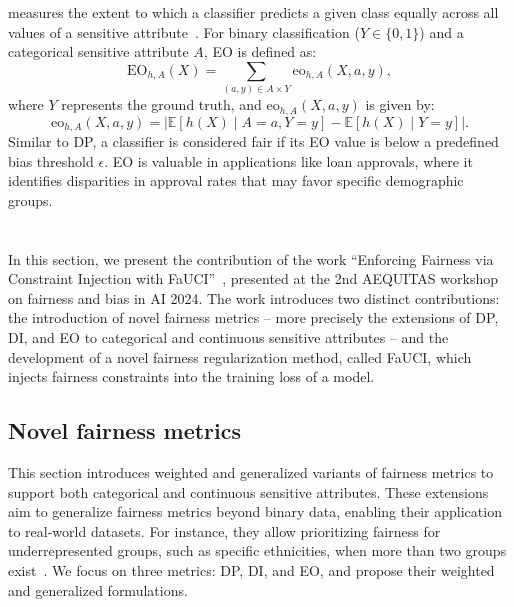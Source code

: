  measures the extent to which a classifier predicts a given class equally across all values of a sensitive attribute~\cite{placeholder}.
%
For binary classification (\( Y \in \{0, 1\} \)) and a categorical sensitive attribute \( A \), \gls{EO} is defined as:
%
\begin{equation}
    \label{eq:eo}
    \text{EO}_{h,A}(X) = \sum_{(a, y) \in A \times Y} \text{eo}_{h,A}(X, a, y),
\end{equation}
%
where \( Y \) represents the ground truth, and \( \text{eo}_{h,A}(X, a, y) \) is given by:
%
\begin{equation}
    \label{eq:eo_partial}
    \text{eo}_{h,A}(X, a, y) = \left| \mathbb{E}[h(X) \mid A = a, Y = y] - \mathbb{E}[h(X) \mid Y = y] \right|.
\end{equation}
%
Similar to \gls{DP}, a classifier is considered fair if its \gls{EO} value is below a predefined bias threshold \( \epsilon \).
%
\Gls{EO} is valuable in applications like loan approvals, where it identifies disparities in approval rates that may favor specific demographic groups.




\section[Fairness under constraints injection]{}\label{sec:fauci}
%
In this section, we present the contribution of the work ``Enforcing Fairness via Constraint Injection with FaUCI''~\cite{DBLP:conf/aequitas/MagniniCCO24}, presented at the 2nd AEQUITAS workshop on fairness and bias in \gls{AI} 2024.
%
The work introduces two distinct contributions: the introduction of novel fairness metrics -- more precisely the extensions of \gls{DP}, \gls{DI}, and \gls{EO} to categorical and continuous sensitive attributes -- and the development of a novel fairness regularization method, called \gls{FaUCI}, which injects fairness constraints into the training loss of a model.


\subsection{Novel fairness metrics}\label{subsec:novel-fairness-metrics}
%
This section introduces weighted and generalized variants of fairness metrics to support both categorical and continuous sensitive attributes.
%
These extensions aim to generalize fairness metrics beyond binary data, enabling their application to real-world datasets.
%
For instance, they allow prioritizing fairness for underrepresented groups, such as specific ethnicities, when more than two groups exist~\cite{placeholder}.
%
We focus on three metrics: \gls{DP}, \gls{DI}, and \gls{EO}, and propose their weighted and generalized formulations.


